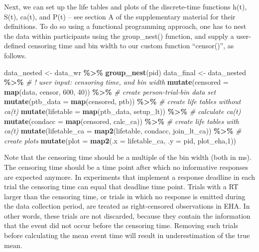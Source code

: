\documentclass[
  man, donotrepeattitle,floatsintext]{apa6}
\newenvironment{Shaded}{\begin{snugshade}}{\end{snugshade}}
\newcommand{\AttributeTok}[1]{\textcolor[rgb]{0.13,0.29,0.53}{#1}}
\newcommand{\CommentTok}[1]{\textcolor[rgb]{0.56,0.35,0.01}{\textit{#1}}}
\newcommand{\DecValTok}[1]{\textcolor[rgb]{0.00,0.00,0.81}{#1}}
\newcommand{\FunctionTok}[1]{\textcolor[rgb]{0.13,0.29,0.53}{\textbf{#1}}}
\newcommand{\NormalTok}[1]{#1}
\newcommand{\OtherTok}[1]{\textcolor[rgb]{0.56,0.35,0.01}{#1}}
\newcommand{\SpecialCharTok}[1]{\textcolor[rgb]{0.81,0.36,0.00}{\textbf{#1}}}
\begin{document}
Next, we can set up the life tables and plots of the discrete-time functions h(t), S(t), ca(t), and P(t) -- see section A of the supplementary material for their definitions. To do so using a functional programming approach, one has to nest the data within participants using the group\_nest() function, and supply a user-defined censoring time and bin width to our custom function ``censor()'', as follows.

\footnotesize

\begin{Shaded}
\begin{Highlighting}[]
\NormalTok{data\_nested }\OtherTok{\textless{}{-}}\NormalTok{ data\_wr }\SpecialCharTok{\%\textgreater{}\%} \FunctionTok{group\_nest}\NormalTok{(pid)}
\NormalTok{data\_final }\OtherTok{\textless{}{-}}\NormalTok{ data\_nested }\SpecialCharTok{\%\textgreater{}\%} 
  \CommentTok{\# ! user input: censoring time, and bin width}
  \FunctionTok{mutate}\NormalTok{(}\AttributeTok{censored =} \FunctionTok{map}\NormalTok{(data, censor, }\DecValTok{600}\NormalTok{, }\DecValTok{40}\NormalTok{)) }\SpecialCharTok{\%\textgreater{}\%}   
  \CommentTok{\# create person{-}trial{-}bin data set}
  \FunctionTok{mutate}\NormalTok{(}\AttributeTok{ptb\_data =} \FunctionTok{map}\NormalTok{(censored, ptb)) }\SpecialCharTok{\%\textgreater{}\%}          
  \CommentTok{\# create life tables without ca(t)}
  \FunctionTok{mutate}\NormalTok{(}\AttributeTok{lifetable =} \FunctionTok{map}\NormalTok{(ptb\_data, setup\_lt)) }\SpecialCharTok{\%\textgreater{}\%}   
  \CommentTok{\# calculate ca(t)}
  \FunctionTok{mutate}\NormalTok{(}\AttributeTok{condacc =} \FunctionTok{map}\NormalTok{(censored, calc\_ca)) }\SpecialCharTok{\%\textgreater{}\%}      
  \CommentTok{\# create life tables with ca(t)}
  \FunctionTok{mutate}\NormalTok{(}\AttributeTok{lifetable\_ca =} \FunctionTok{map2}\NormalTok{(lifetable, condacc, join\_lt\_ca)) }\SpecialCharTok{\%\textgreater{}\%}    
  \CommentTok{\# create plots }
  \FunctionTok{mutate}\NormalTok{(}\AttributeTok{plot =} \FunctionTok{map2}\NormalTok{(}\AttributeTok{.x =}\NormalTok{ lifetable\_ca, }\AttributeTok{.y =}\NormalTok{ pid, plot\_eha,}\DecValTok{1}\NormalTok{))  }
\end{Highlighting}
\end{Shaded}

\normalsize

Note that the censoring time should be a multiple of the bin width (both in ms). The censoring time should be a time point after which no informative responses are expected anymore. In experiments that implement a response deadline in each trial the censoring time can equal that deadline time point. Trials with a RT larger than the censoring time, or trials in which no response is emitted during the data collection period, are treated as right-censored observations in EHA. In other words, these trials are not discarded, because they contain the information that the event did not occur before the censoring time. Removing such trials before calculating the mean event time will result in underestimation of the true mean.
\end{document}

